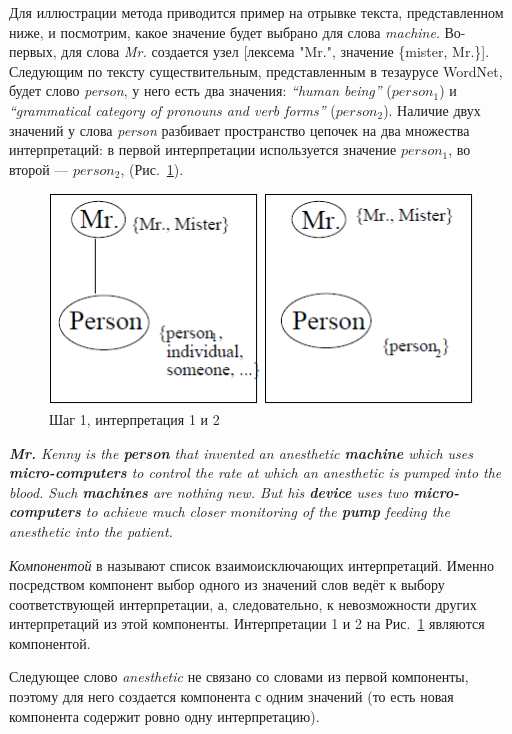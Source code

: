 \documentclass{article}
\begin{document}
\begin{articletext}
Для иллюстрации метода приводится пример на отрывке текста, представленном ниже, и посмотрим, какое значение будет выбрано для слова \textit{machine}. Во-первых, для слова \textit{Mr.} создается узел [лексема "Mr.", значение \{mister, Mr.\}]. Следующим по тексту существительным, представленным в тезаурусе WordNet, будет слово \textit{person}, у него есть два значения: \textit{“human being”} ($person_1$) и \textit{“grammatical category of pronouns and verb forms”} ($person_2$). Наличие двух значений у слова \textit{person} разбивает пространство цепочек на два множества интерпретаций: в первой интерпретации используется значение  $person_1$, во второй --- $person_2$, (Рис.~\ref{step1}).

\begin{figure}[H]
    \includegraphics[keepaspectratio=true,width=0.9\columnwidth]{step_1_int_1_2.PNG}
    \caption{Шаг 1, интерпретация 1 и 2}
    \label{step1}
\end{figure}

\textit{\textbf{Mr.} Kenny is the \textbf{person} that invented an anesthetic \textbf{machine} which uses \textbf{micro-computers} to control the rate at which an anesthetic is pumped into the blood. Such \textbf{machines} are nothing new. But his \textbf{device} uses two \textbf{micro-computers} to achieve much closer monitoring of the \textbf{pump} feeding the anesthetic into the patient.}

\textit{Компонентой} в \cite{Barzilay Elhadad 1997}  называют список взаимоисключающих интерпретаций. Именно посредством компонент выбор одного из значений слов ведёт к выбору соответствующей интерпретации, а, следовательно, к невозможности других интерпретаций из этой компоненты. Интерпретации 1 и 2 на Рис.~\ref{step1} являются компонентой.

Следующее слово \textit{anesthetic} не связано со словами из первой компоненты, поэтому для него создается  компонента с одним значений (то есть новая компонента содержит ровно одну интерпретацию). 


\end{articletext}
\end{document}

